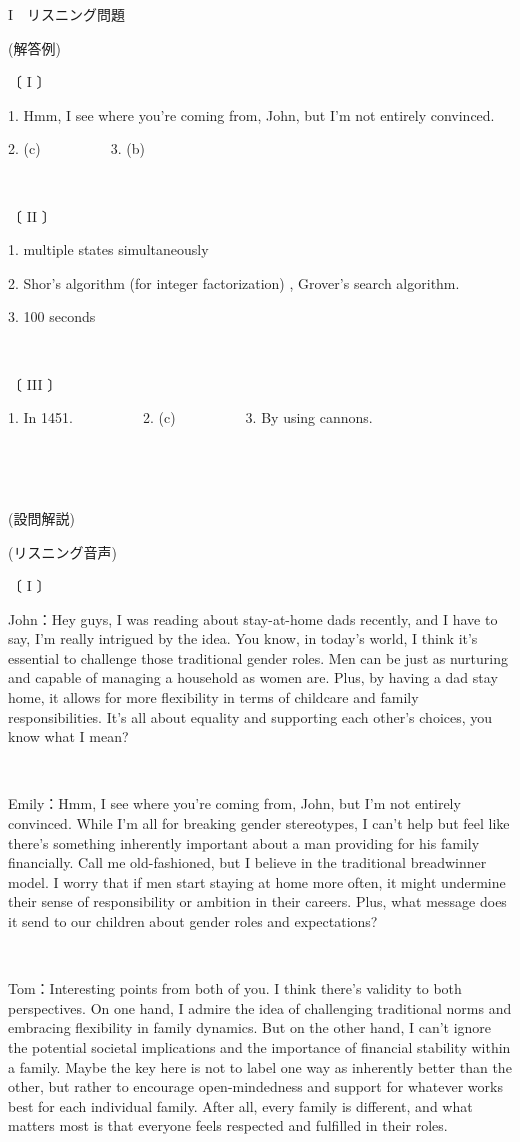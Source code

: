 \documentclass[12pt,a4paper,dvipdfmx]{jarticle}
\begin{document}
\begin{spacing}{1.5}


{\Large\textbf{$\mathrm{I}$}}　リスニング問題

(解答例)

〔 I 〕

1. Hmm, I see where you're coming from, John, but I'm not entirely convinced.

2. (c)　　　　　3. (b)

\

〔 II 〕

1. multiple states simultaneously

2. Shor's algorithm (for integer factorization) , Grover's search algorithm.

3. 100 seconds

\

〔 III 〕

1. In 1451.　　　　　2. (c)　　　　　3. By using cannons.

\

\

(設問解説)




\newpage

(リスニング音声)

〔 I 〕

John：Hey guys, I was reading about stay-at-home dads recently, and I have to say, I'm really intrigued by the idea. You know, in today's world, I think it's essential to challenge those traditional gender roles. Men can be just as nurturing and capable of managing a household as women are. Plus, by having a dad stay home, it allows for more flexibility in terms of childcare and family responsibilities. It's all about equality and supporting each other's choices, you know what I mean?

\

Emily：Hmm, I see where you're coming from, John, but I'm not entirely convinced. While I'm all for breaking gender stereotypes, I can't help but feel like there's something inherently important about a man providing for his family financially. Call me old-fashioned, but I believe in the traditional breadwinner model. I worry that if men start staying at home more often, it might undermine their sense of responsibility or ambition in their careers. Plus, what message does it send to our children about gender roles and expectations?

\

Tom：Interesting points from both of you. I think there's validity to both perspectives. On one hand, I admire the idea of challenging traditional norms and embracing flexibility in family dynamics. But on the other hand, I can't ignore the potential societal implications and the importance of financial stability within a family. Maybe the key here is not to label one way as inherently better than the other, but rather to encourage open-mindedness and support for whatever works best for each individual family. After all, every family is different, and what matters most is that everyone feels respected and fulfilled in their roles.


\end{spacing}
\end{document}
